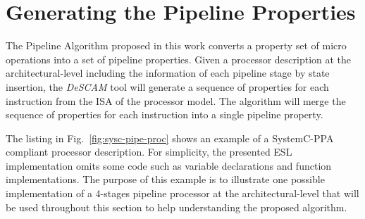 \section{Generating the Pipeline Properties}
\label{section:pipe-algorithm}

The Pipeline Algorithm proposed in this work converts a property set of micro operations into a set of pipeline properties. Given a processor description at the architectural-level including the information of each pipeline stage by state insertion, the \textit{DeSCAM} tool will generate a sequence of properties for each instruction from the ISA of the processor model. The algorithm will merge the sequence of properties for each instruction into a single pipeline property. 

The listing in Fig.~\ref{fig:sysc-pipe-proc} shows an example of a SystemC-PPA compliant processor description. For simplicity, the presented ESL implementation omits some code such as variable declarations and function implementations. The purpose of this example is to illustrate one possible implementation of a 4-stages pipeline processor at the architectural-level that will be used throughout this section to help understanding the proposed algorithm.

